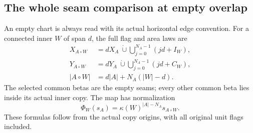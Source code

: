 \documentclass[11pt,a4paper]{amsart}
\numberwithin{equation}{section}
\theoremstyle{plain}
\theoremstyle{definition}
\begin{document}
\subsection{The whole seam comparison at empty overlap}

An empty chart is always read with its actual horizontal edge convention.
For a connected inner \(W\) of span \(d\), the full flag and area laws are
\[
 \begin{aligned}
 X_{A\circ W}&=dX_A\ \dot\cup\!
                  \bigcup_{j=0}^{N_A-1}(jd+I_W),\\
 Y_{A\circ W}&=dY_A\ \dot\cup\!
                  \bigcup_{j=0}^{N_A-1}(jd+C_W),\\
 |A\circ W|&=d|A|+N_A(|W|-d).
 \end{aligned}
\]
The selected common betas are the empty seams; every other common beta
lies inside its actual inner copy.  The map has normalization
\[
 \Phi_W(s_A)=\kappa(W)^{|A|-N_A}s_{A\circ W}.
\]
These formulas follow from the actual copy origins, with all original
unit flags included.
\end{document}
